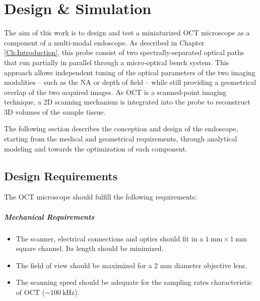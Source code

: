 %

\chapter{Design \& Simulation}
\label{Ch:DesignSimulation}	

The aim of this work is to design and test a miniaturized OCT microscope as a component of a multi-modal endoscope. As described in Chapter \ref{Ch:Introduction}, this probe consist of two spectrally-separated optical paths that run partially in parallel through a micro-optical bench system. This approach allows independent tuning of the optical parameters of the two imaging modalities -- such as the NA or depth of field -- while still providing a geometrical overlap of the two acquired images. As OCT is a scanned-point imaging technique, a 2D scanning mechanism is integrated into the probe to reconstruct 3D volumes of the sample tissue.

The following section describes the conception and design of the endoscope, starting from the medical and geometrical requirements, through analytical modeling and towards the optimization of each component.

\section{Design Requirements}



The OCT microscope should fulfill the following requirements:

\paragraph{Mechanical Requirements} 
\begin{itemize}

\item The scanner, electrical connections and optics should fit in a $\SI{1}{\milli\meter} \times \SI{1}{\milli\meter}$ square channel. Its length should be minimized.
\item The field of view should be maximized for a 2 mm diameter objective lens.
\item The scanning speed should be adequate for the sampling rates characteristic of OCT ($\sim \SI{100}{\kilo\hertz} $).
\end{itemize}


